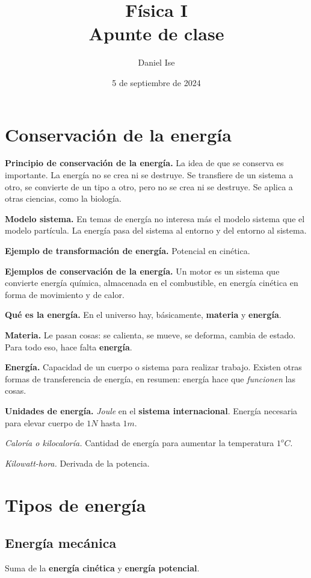 \documentclass[12pt]{article}
\title{Física I\\Apunte de clase}
\author{Daniel Ise}
\date{5 de septiembre de 2024}
\begin{document}
\maketitle
\tableofcontents

\section{Conservación de la energía}

\textbf{Principio de conservación de la energía.}
La idea de que se conserva es importante.
La energía no se crea ni se destruye.
Se transfiere de un sistema a otro,
se convierte de un tipo a otro,
pero no se crea ni se destruye.
Se aplica a otras ciencias,
como la biología.

\textbf{Modelo sistema.}
En temas de energía no interesa más el modelo sistema que el modelo partícula.
La energía pasa del sistema al entorno y del entorno al sistema.

\textbf{Ejemplo de transformación de energía.}
Potencial en cinética.

\textbf{Ejemplos de conservación de la energía.}
Un motor es un sistema que convierte energía química,
almacenada en el combustible,
en energía cinética en forma de movimiento y de calor.

\textbf{Qué es la energía.}
En el universo hay,
básicamente,
\textbf{materia} y \textbf{energía}.

\textbf{Materia.}
Le pasan cosas:
se calienta,
se mueve,
se deforma,
cambia de estado.
Para todo eso,
hace falta \textbf{energía}.

\textbf{Energía.}
Capacidad de un cuerpo o sistema para realizar trabajo.
Existen otras formas de transferencia de energía,
en resumen:
energía hace que \textit{funcionen} las cosas.

\textbf{Unidades de energía.}
\textit{Joule} en el \textbf{sistema internacional}.
Energía necesaria para elevar cuerpo de \(1 N\) hasta \(1 m\).

\textit{Caloría o kilocaloría.}
Cantidad de energía para aumentar la temperatura \(1^oC\).

\textit{Kilowatt-hora.}
Derivada de la potencia.

\section{Tipos de energía}

\subsection{Energía mecánica}
Suma de la \textbf{energía cinética} y \textbf{energía potencial}.
\end{document}
